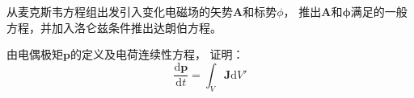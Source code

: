 \begin{question}
    从麦克斯韦方程组出发引入变化电磁场的矢势$\mathbf{A}$和标势$\phi$，
    推出$\mathbf{A}$和$\mathbf{\phi}$满足的一般方程，并加入洛仑兹条件推出达朗伯方程。
\end{question}

\begin{question}
    由电偶极矩$\mathbf{p}$的定义及电荷连续性方程，
    证明：$$\frac{\mathrm{d} \mathbf{p}}{\mathrm{d} t}=\int_V \mathbf{J}\mathrm{d}V'$$    
\end{question}
